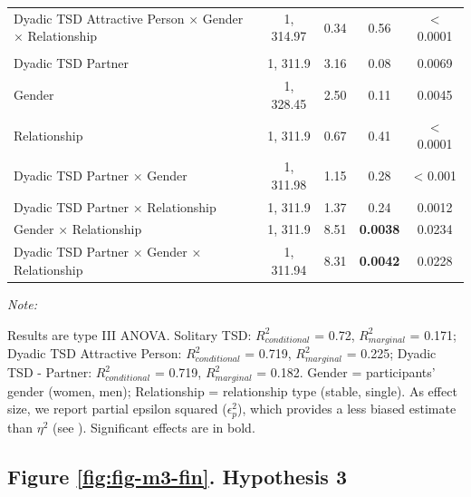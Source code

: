 \documentclass[
  bookmarksnumbered]{article}
\begin{document}
\begin{table}[H]
{\begin{threeparttable}
\begin{tabular}[t]{lcccc}
\hspace{1em}Dyadic TSD Attractive Person × Gender × Relationship & 1, 314.97 & 0.34 & 0.56 & < 0.0001\\
\addlinespace[0.3em]
\multicolumn{5}{l}{\cellcolor{lightgray}{Dyadic TSD Partner}}\\
\hspace{1em}Dyadic TSD Partner & 1, 311.9 & 3.16 & 0.08 & 0.0069\\
\hspace{1em}Gender & 1, 328.45 & 2.50 & 0.11 & 0.0045\\
\hspace{1em}Relationship & 1, 311.9 & 0.67 & 0.41 & < 0.0001\\
\hspace{1em}Dyadic TSD Partner × Gender & 1, 311.98 & 1.15 & 0.28 & < 0.001\\
\hspace{1em}Dyadic TSD Partner × Relationship & 1, 311.9 & 1.37 & 0.24 & 0.0012\\
\hspace{1em}Gender × Relationship & 1, 311.9 & 8.51 & \textbf{0.0038} & 0.0234\\
\hspace{1em}Dyadic TSD Partner × Gender × Relationship & 1, 311.94 & 8.31 & \textbf{0.0042} & 0.0228\\
\bottomrule
\end{tabular}
\begin{tablenotes}[para]
\item \textit{Note: } 
\item Results are type III ANOVA. Solitary TSD: $R^2_{conditional}$ = 0.72, $R^2_{marginal}$ = 0.171; Dyadic TSD Attractive Person: $R^2_{conditional}$ = 0.719, $R^2_{marginal}$ = 0.225; Dyadic TSD - Partner: $R^2_{conditional}$ = 0.719, $R^2_{marginal}$ = 0.182. Gender = participants' gender (women, men); Relationship = relationship type
      (stable, single). As effect size, we report partial epsilon squared ($\epsilon^2_p$),
      which provides a less biased estimate than $\eta^2$ 
      (see \cite{albersWhenPowerAnalyses2018}). Significant effects are in bold.
\end{tablenotes}
\end{threeparttable}}
\end{table}

\subsection{Figure \ref{fig:fig-m3-fin}. Hypothesis 3}\label{figure-reffigfig-m3-fin.-hypothesis-3}
\end{document}
